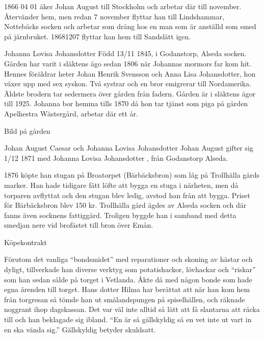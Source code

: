 1866 04 01 åker Johan August till Stockholm och arbetar där till november. Återvänder hem, men redan 7 november flyttar han till Lindshammar, Nottebäcks socken och arbetar som dräng hos en man som är anställd som smed på järnbruket. 18681207 flyttar han hem till Sandslätt igen.










Johanna Lovisa Johansdotter
Född 13/11 1845, i Godanstorp, Alseda socken.
Gården har varit i släktens ägo sedan 1806 när Johannas mormors far kom hit.
Hennes föräldrar heter Johan Henrik Svensson och Anna Lisa Johansdotter, hon växer upp med sex syskon. Två systrar och en bror emigrerar till Nordamerika. Äldste brodern tar sedermera över gården från fadern. Gården är i släktens ägor till 1925.
Johanna bor hemma tills 1870 då hon tar tjänst som piga på gården Apelhestra Wästergård, arbetar där ett år. 


Bild på gården














Johan August Caesar och Johanna Lovisa Johansdotter
Johan August gifter sig 1/12 1871 med Johanna Lovisa Johansdotter , från Godanstorp Alseda. 


1876 köpte han stugan på Broatorpet (Bärbäcksbron) som låg på Trollhälla gårds marker. Han hade tidigare fått löfte att bygga en stuga i närheten, men då torparen avflyttat och den stugan blev ledig, avstod han från att bygga. Priset för Bärbäcksbron blev 150 kr. Trollhälla gård ägdes av Alseda socken och där fanns även socknens fattiggård. Troligen byggde han i samband med detta smedjan nere vid brofästet till bron över Emån.


Köpekontrakt


Förutom det vanliga “bondsmidet” med reparationer och skoning av hästar och dyligt, tillverkade han diverse verktyg som potatishackor, lövhackar och “riskar” som han sedan sålde på torget i Vetlanda. Åkte då med någon bonde som hade egna ärenden till torget. Hans dotter Hilma har berättat att när han kom hem från torgresan så tömde han ut smålandspungen på spiselhällen, och räknade noggrant ihop dagskassan. Det var väl inte alltid så lätt att få slantarna att räcka till och han beklagade sig ibland. ``En är så gällskyldig så en vet inte ut vart in en ska vända sig.'' Gällskyldig betyder skuldsatt.


